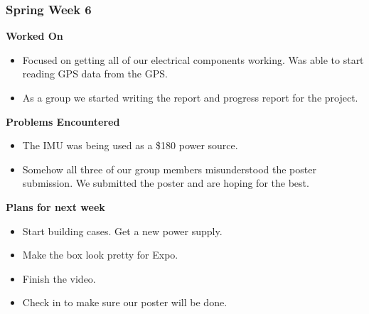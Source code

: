 \documentclass[compsoc,draftclsnofoot,onecolumn,10pt]{IEEEtran}
\begin{document}
\subsubsection*{Spring Week 6}
\textbf{Worked On}
\begin{itemize}
    \item Focused on getting all of our electrical components working. Was able to start reading GPS data from the GPS.
    \item As a group we started writing the report and progress report for the project.
\end{itemize}
\textbf{Problems Encountered}
\begin{itemize}
    \item The IMU was being used as a \$180 power source.
    \item Somehow all three of our group members misunderstood the poster submission. 
    We submitted the poster and are hoping for the best.
\end{itemize}
\textbf{Plans for next week}
\begin{itemize}
    \item Start building cases. Get a new power supply.
    \item Make the box look pretty for Expo.
    \item Finish the video.
    \item Check in to make sure our poster will be done.
\end{itemize}
\end{document}
